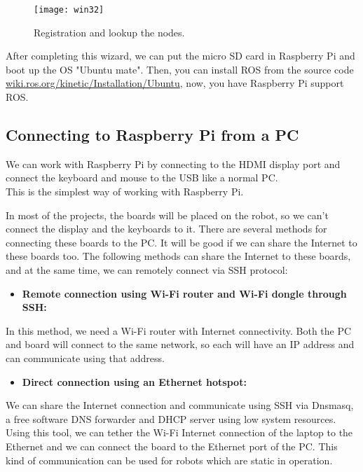 \begin{figure}[h]		
	\centering
	\texttt{[image: win32]}
	\caption{Registration and lookup the nodes.}
	\label{Fig:Win32}
\end{figure}

After completing this wizard, we can put the micro SD card in Raspberry Pi and boot up the OS "Ubuntu mate". Then, you can install ROS from the source code \url{wiki.ros.org/kinetic/Installation/Ubuntu}, now, you have Raspberry Pi support ROS.

\subsection{Connecting to Raspberry Pi from a PC}

We can work with Raspberry Pi  by connecting to the HDMI display port and connect the keyboard and mouse to the USB like a normal PC.\\
This is the simplest way of working with Raspberry Pi.

In most of the projects, the boards will be placed on the robot, so we can't connect the display and the keyboards to it. There are several methods for connecting these boards to the PC. 
It will be good if we can share the Internet to these boards too. The following methods can share the Internet to these boards, and at the same time, we can remotely connect via SSH protocol:

\begin{itemize}
	\item \textbf{Remote connection using Wi-Fi router and Wi-Fi dongle through SSH:}
\end{itemize}
In this method, we need a Wi-Fi router with Internet connectivity. 
Both the PC and board will connect to the same network, so each will have an IP address and can communicate using that address.

\begin{itemize}
	\item \textbf{Direct connection using an Ethernet hotspot:}
\end{itemize}

We can share the Internet connection and communicate using SSH via Dnsmasq, a free software DNS forwarder and DHCP server using low system resources. Using this tool, we can tether the Wi-Fi Internet connection of the laptop to the Ethernet and we can connect the board to the Ethernet port of the PC. This kind of communication can be used for robots which are static in operation.

